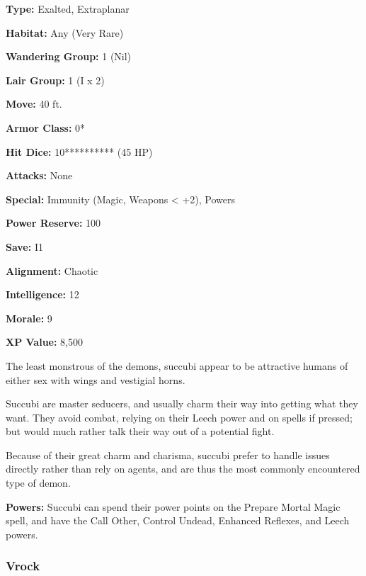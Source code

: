 \begin{multicols*}{2}
{\textbf{Type:} Exalted, Extraplanar

\textbf{Habitat:} Any (Very Rare)

\textbf{Wandering Group:} 1 (Nil)

\textbf{Lair Group:} 1 (I x 2)

\textbf{Move:} 40 ft.

\textbf{Armor Class:} 0*

\textbf{Hit Dice:} 10********** (45 HP)

\textbf{Attacks:} None

\textbf{Special:} Immunity (Magic, Weapons < +2), Powers

\textbf{Power Reserve:} 100

\textbf{Save:} I1

\textbf{Alignment:} Chaotic

\textbf{Intelligence:} 12

\textbf{Morale:} 9

\textbf{XP Value:} 8,500}

The least monstrous of the demons, succubi appear to be attractive humans of either sex with wings and vestigial horns.

Succubi are master seducers, and usually charm their way into getting what they want. They avoid combat, relying on their Leech power and on spells if pressed; but would much rather talk their way out of a potential fight.

Because of their great charm and charisma, succubi prefer to handle issues directly rather than rely on agents, and are thus the most commonly encountered type of demon.

\textbf{Powers:} Succubi can spend their power points on the Prepare Mortal Magic spell, and have the Call Other, Control Undead, Enhanced Reflexes, and Leech powers.

\subsubsection{Vrock}
\end{multicols*}
